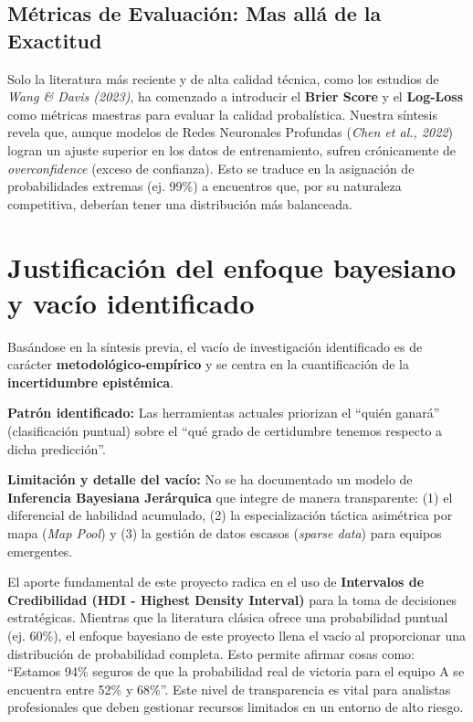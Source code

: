\documentclass[12pt,a4paper]{article}
\begin{document}
\subsection{Métricas de Evaluación: Mas allá de la Exactitud}
Solo la literatura más reciente y de alta calidad técnica, como los estudios de \textit{Wang \& Davis (2023)}, ha comenzado a introducir el \textbf{Brier Score} y el \textbf{Log-Loss} como métricas maestras para evaluar la calidad probalística. Nuestra síntesis revela que, aunque modelos de Redes Neuronales Profundas (\textit{Chen et al., 2022}) logran un ajuste superior en los datos de entrenamiento, sufren crónicamente de \textit{overconfidence} (exceso de confianza). Esto se traduce en la asignación de probabilidades extremas (ej. 99\%) a encuentros que, por su naturaleza competitiva, deberían tener una distribución más balanceada.

\section{Justificación del enfoque bayesiano y vacío identificado}

Basándose en la síntesis previa, el vacío de investigación identificado es de carácter \textbf{metodológico-empírico} y se centra en la cuantificación de la \textbf{incertidumbre epistémica}.

\textbf{Patrón identificado:} Las herramientas actuales priorizan el ``quién ganará'' (clasificación puntual) sobre el ``qué grado de certidumbre tenemos respecto a dicha predicción''.

\textbf{Limitación y detalle del vacío:} No se ha documentado un modelo de \textbf{Inferencia Bayesiana Jerárquica} que integre de manera transparente: (1) el diferencial de habilidad acumulado, (2) la especialización táctica asimétrica por mapa (\textit{Map Pool}) y (3) la gestión de datos escasos (\textit{sparse data}) para equipos emergentes. 

El aporte fundamental de este proyecto radica en el uso de \textbf{Intervalos de Credibilidad (HDI - Highest Density Interval)} para la toma de decisiones estratégicas. Mientras que la literatura clásica ofrece una probabilidad puntual (ej. 60\%), el enfoque bayesiano de este proyecto llena el vacío al proporcionar una distribución de probabilidad completa. Esto permite afirmar cosas como: ``Estamos 94\% seguros de que la probabilidad real de victoria para el equipo A se encuentra entre 52\% y 68\%''. Este nivel de transparencia es vital para analistas profesionales que deben gestionar recursos limitados en un entorno de alto riesgo.
\end{document}
